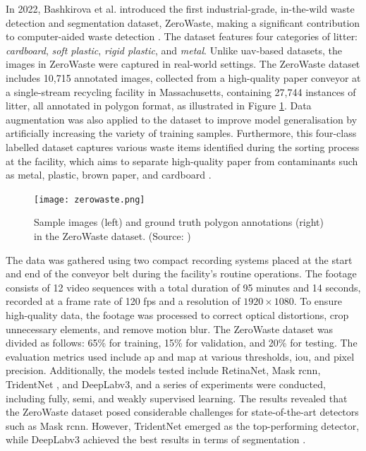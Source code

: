 In 2022, Bashkirova et al. introduced the first industrial-grade, in-the-wild waste detection and segmentation dataset, ZeroWaste, making a significant contribution to computer-aided waste detection \cite{zerowaste}. The dataset features four categories of litter: \textit{cardboard}, \textit{soft plastic}, \textit{rigid plastic}, and \textit{metal}. Unlike \gls{uav}-based datasets, the images in ZeroWaste were captured in real-world settings.
The ZeroWaste dataset includes 10,715 annotated images, collected from a high-quality paper conveyor at a single-stream recycling facility in Massachusetts, containing 27,744 instances of litter, all annotated in polygon format, as illustrated in Figure \ref{fig:zerowaste}. Data augmentation was also applied to the dataset to improve model generalisation by artificially increasing the variety of training samples. Furthermore, this four-class labelled dataset captures various waste items identified during the sorting process at the facility, which aims to separate high-quality paper from contaminants such as metal, plastic, brown paper, and cardboard \cite{zerowaste}.

\begin{figure}[!htbp]
    \centering
    \texttt{[image: zerowaste.png]}
    \caption{Sample images (left) and ground truth polygon annotations (right) in the ZeroWaste dataset. (Source: \cite{zerowaste})}
    \label{fig:zerowaste}
\end{figure}

The data was gathered using two compact recording systems placed at the start and end of the conveyor belt during the facility's routine operations. The footage consists of 12 video sequences with a total duration of 95 minutes and 14 seconds, recorded at a frame rate of 120 \gls{fps} and a resolution of $1920 \times 1080$. To ensure high-quality data, the footage was processed to correct optical distortions, crop unnecessary elements, and remove motion blur.
The ZeroWaste dataset was divided as follows: 65\% for training, 15\% for validation, and 20\% for testing. The evaluation metrics used include \gls{ap} and \gls{map} at various thresholds, \gls{iou}, and pixel precision. Additionally, the models tested include RetinaNet, Mask \gls{rcnn}, TridentNet \cite{tridentnet}, and DeepLabv3, and a series of experiments were conducted, including fully, semi, and weakly supervised learning.
The results revealed that the ZeroWaste dataset posed considerable challenges for state-of-the-art detectors such as Mask \gls{rcnn}. However, TridentNet emerged as the top-performing detector, while DeepLabv3 achieved the best results in terms of segmentation \cite{zerowaste}.

